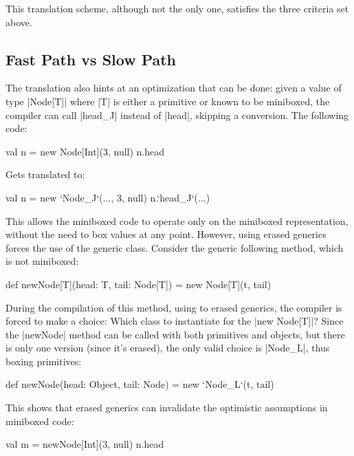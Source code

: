 This translation scheme, although not the only one, satisfies the three criteria set above.

\subsection{Fast Path vs Slow Path}

The translation also hints at an optimization that can be done: given a value of type |Node[T]| where |T| is either a primitive or known to be miniboxed, the compiler can call |head_J| instead of |head|, skipping a conversion. The following code:

\begin{lstlisting-nobreak}
 val n = new Node[Int](3, null)
 n.head
\end{lstlisting-nobreak}

Gets translated to:

\begin{lstlisting-nobreak}
 val n = new `Node_J`(..., 3, null)
 n.`head_J`(...)
\end{lstlisting-nobreak}

This allows the miniboxed code to operate only on the miniboxed representation, without the need to box values at any point. However, using erased generics forces the use of the generic class. Consider the generic following method, which is not miniboxed:

\begin{lstlisting-nobreak}
 def newNode[T](head: T, tail: Node[T]) =
   new Node[T](t, tail)
\end{lstlisting-nobreak}

During the compilation of this method, using to erased generics, the compiler is forced to make a choice: Which class to instantiate for the |new Node[T]|? Since the |newNode| method can be called with both primitives and objects, but there is only one version (since it's erased), the only valid choice is |Node_L|, thus boxing primitives:

\begin{lstlisting-nobreak}
 def newNode(head: Object, tail: Node) =
   new `Node_L`(t, tail)
\end{lstlisting-nobreak}

This shows that erased generics can invalidate the optimistic assumptions in miniboxed code:

\begin{lstlisting-nobreak}
 val m = newNode[Int](3, null)
 n.head
\end{lstlisting-nobreak}

